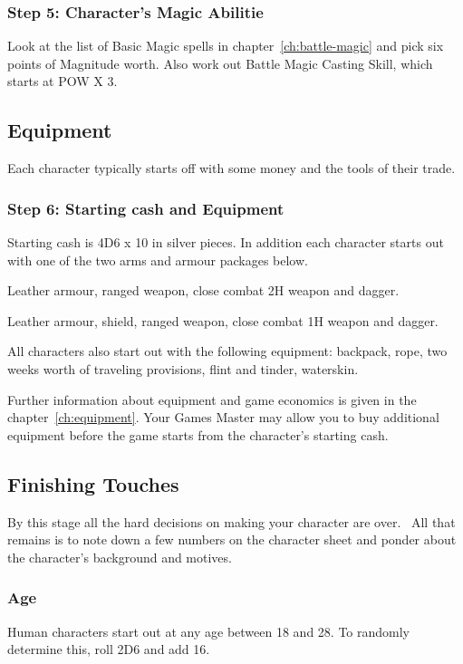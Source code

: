 \subsubsection{Step 5: Character's Magic Abilitie}
Look at the list of Basic Magic spells in chapter~\ref{ch:battle-magic} and pick six points of Magnitude worth. Also work out Battle Magic Casting Skill, which starts at POW X 3.

\subsection{Equipment}
Each character typically starts off with some money and the tools of their trade.

\subsubsection{Step 6: Starting cash and Equipment}
Starting cash is 4D6 x 10 in silver pieces. In addition each character starts out with one of the two arms and armour packages below.

\begin{rpg-list}
	\item Leather armour, ranged weapon, close combat 2H weapon and dagger. 
	\item Leather armour, shield, ranged weapon, close combat 1H weapon and dagger.
\end{rpg-list}

All characters also start out with the following equipment: backpack, rope, two weeks worth of traveling provisions, flint and tinder, waterskin.

Further information about equipment and game economics is given in the chapter~\ref{ch:equipment}. Your Games Master may allow you to buy additional equipment before the game starts from the character’s starting cash.

\subsection{Finishing Touches}
By this stage all the hard decisions on making your character are over.  All that remains is to note down a few numbers on the character sheet and ponder about the character’s background and motives.

\subsubsection{Age}
Human characters start out at any age between 18 and 28. To randomly determine this, roll 2D6 and add 16. 

